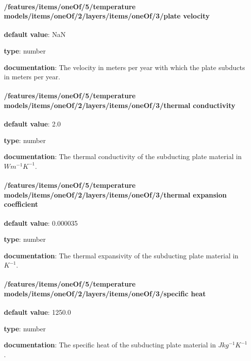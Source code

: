 \begin{itemized}
\end{itemized}\paragraph{/features/items/oneOf/5/temperature models/items/oneOf/2/layers/items/oneOf/3/plate velocity} \begin{itemized}
\item {\bf default value}: NaN
\item {\bf type}: number
\item {\bf documentation}: The velocity in meters per year with which the plate subducts in meters per year.
\end{itemized}\paragraph{/features/items/oneOf/5/temperature models/items/oneOf/2/layers/items/oneOf/3/thermal conductivity} \begin{itemized}
\item {\bf default value}: 2.0
\item {\bf type}: number
\item {\bf documentation}: The thermal conductivity of the subducting plate material in $W m^{-1} K^{-1}$.
\end{itemized}\paragraph{/features/items/oneOf/5/temperature models/items/oneOf/2/layers/items/oneOf/3/thermal expansion coefficient} \begin{itemized}
\item {\bf default value}: 0.000035
\item {\bf type}: number
\item {\bf documentation}: The thermal expansivity of the subducting plate material in $K^{-1}$.
\end{itemized}\paragraph{/features/items/oneOf/5/temperature models/items/oneOf/2/layers/items/oneOf/3/specific heat} \begin{itemized}
\item {\bf default value}: 1250.0
\item {\bf type}: number
\item {\bf documentation}: The specific heat of the subducting plate material in $J kg^{-1} K^{-1}$.

\end{itemized}
